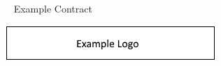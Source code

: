 {
	\
	\vfil
	\hfil Example Contract \hfil
	\vfil
    \parbox[b][0.625in][t]{6.5in}{
        \vspace{-0.375in}
        \parbox[b][0.625in][t]{3.74in}{
            \href{http://my.web.site}
            {\includegraphics{ExampleLogo.png}}
        }
        \hfill
    }
	\pagebreak
}



